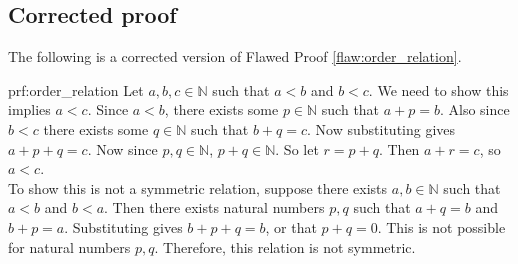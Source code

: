 \clearpage
\subsection{Corrected proof}

The following is a corrected version of Flawed Proof \ref{flaw:order_relation}. %

\begin{prf}{prf:order_relation} %
Let $a,b,c \in \mathbb{N}$ such that $a<b$ and $b < c$. We need to show this implies $a < c$. Since $a<b$, there exists some $p \in \mathbb{N}$ such that $a+p = b$. Also since $b<c$ there exists some $q \in \mathbb{N}$ such that $b + q = c$. Now substituting gives $a + p + q = c$. Now since $p,q \in \mathbb{N}$, $p+q \in \mathbb{N}$. So let $r = p+q$. Then $a+r = c$, so $a < c$. \\

To show this is not a symmetric relation, suppose there exists $a,b \in \mathbb{N}$ such that $a<b$ and $b<a$. Then there exists natural numbers $p,q$ such that $a+q = b$ and $b+p = a$. Substituting gives $b+p+q = b$, or that $p+q = 0$. This is not possible for natural numbers $p,q$. Therefore, this relation is not symmetric. 
\end{prf}